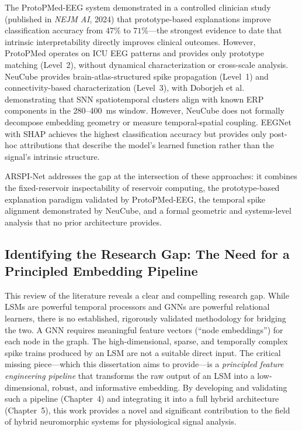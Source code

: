 The ProtoPMed-EEG system \cite{barnett_protopmed_2024} demonstrated in a controlled clinician study (published in \emph{NEJM AI}, 2024) that prototype-based explanations improve classification accuracy from $47\%$ to $71\%$---the strongest evidence to date that intrinsic interpretability directly improves clinical outcomes. However, ProtoPMed operates on ICU EEG patterns and provides only prototype matching (Level~2), without dynamical characterization or cross-scale analysis. NeuCube \cite{kasabov_neucube_2014} provides brain-atlas-structured spike propagation (Level~1) and connectivity-based characterization (Level~3), with Doborjeh et al.\ \cite{doborjeh_explainable_2021} demonstrating that SNN spatiotemporal clusters align with known ERP components in the 280--400~ms window. However, NeuCube does not formally decompose embedding geometry or measure temporal-spatial coupling. EEGNet with SHAP \cite{lawhern_eegnet_2018} achieves the highest classification accuracy but provides only post-hoc attributions that describe the model's learned function rather than the signal's intrinsic structure.

ARSPI-Net addresses the gap at the intersection of these approaches: it combines the fixed-reservoir inspectability of reservoir computing, the prototype-based explanation paradigm validated by ProtoPMed-EEG, the temporal spike alignment demonstrated by NeuCube, and a formal geometric and systems-level analysis that no prior architecture provides.

\subsection{Identifying the Research Gap: The Need for a Principled Embedding Pipeline}
\label{sec:research_gap}
This review of the literature reveals a clear and compelling research gap. While LSMs are powerful temporal processors and GNNs are powerful relational learners, there is no established, rigorously validated methodology for bridging the two. A GNN requires meaningful feature vectors (``node embeddings'') for each node in the graph. The high-dimensional, sparse, and temporally complex spike trains produced by an LSM are not a suitable direct input. The critical missing piece---which this dissertation aims to provide---is a \emph{principled feature engineering pipeline} that transforms the raw output of an LSM into a low-dimensional, robust, and informative embedding. By developing and validating such a pipeline (Chapter~4) and integrating it into a full hybrid architecture (Chapter~5), this work provides a novel and significant contribution to the field of hybrid neuromorphic systems for physiological signal analysis.